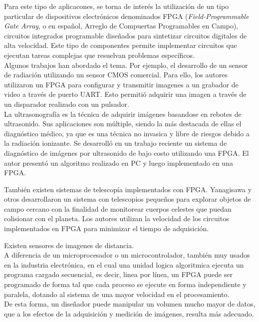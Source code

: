 Para este tipo de aplicacones, se torna de interés la utilización de un tipo particular de dispositivos electrónicos denominados FPGA ({\it Field-Programmable Gate Array}, o en español, Arreglo de Compuertas Programables en Campo), circuitos integrados  programable diseñados para sintetizar circuitos digitales de alta velocidad. Este tipo de componentes permite implementar circuitos que ejecutan tareas complejas que resuelvan problemas específicos.\\

Algunos trabajos han abordado el tema. Por ejemplo, el desarrollo de un sensor de radiación utilizando un sensor CMOS comercial. Para ello, los autores utilizaron un FPGA para configurar y transmitir imagenes a un grabador de video a través de puerto UART. Esto permitió adquirir una imagen a través de un disparador realizado con un pulsador\cite{Perez2017}.\\

La ultrasonografía es la técnica de adquirir imágenes basandose en rebotes de ultrasonido. Sus aplicaciones son múltiple, siendo la más destacada de ellas el diagnóstico médico, ya que es una técnica no invasica y libre de riesgos debido a la radiación ionizante. Se desarrolló en un trabajo reciente un sistema de diagnóstico de imágenes por ultrasonido de bajo costo utilizando una FPGA\cite{biswas2018embedded}. El autor presentó un algoritmo realizado en PC y luego implementado en una FPGA.

También existen sistemas de telescopía implementados con FPGA. Yanagisawa y otros desarrollaron un sistema con telescopios pequeños para explorar objetos de campo cercano con la finalidad de monitorear cuerpos celestes que puedan colisionar con el planeta\cite{Yanagisawa2018}. Los autores utilizan la velocidad de los circuitos implementados en FPGA para minimizar el tiempo de adquisición.

Existen sensores de imagenes de distancia\cite{Cui2018}.\\

A diferencia de un microprocesador o un microcontrolador, también muy usados en la industria electrónica, en el cual una unidad logica algoritmica ejecuta un programa cargado secuencial, es decir, linea por línea, un FPGA puede ser programado de forma tal que cada proceso se ejecute en forma independiente y paralela, dotando al sistema de una mayor velocidad en el procesamiento.\\

De esta forma, un diseñador puede manipular un volumen mucho mayor de datos, que a los efectos de la adquisición y medición de imágenes, resulta más adecuado.\\

